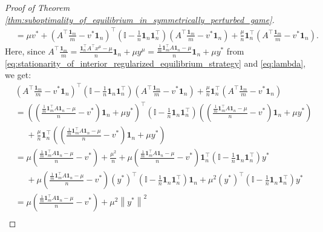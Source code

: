 \documentclass{article}
\newcommand{\bone}{\mathbf{1}}
\theoremstyle{plain}
\begin{document}
\begin{proof}[Proof of Theorem \ref{thm:suboptimality_of_equilibrium_in_symmetrically_perturbed_game}]
\begin{align}
        & = \mu v^{\ast} + \left(A^{\top}\frac{\bone_m}{m} - v^{\ast}\bone_n\right)^{\top}\left(\mathbb{I} - \frac{1}{n}\bone_n\bone_n^{\top}\right)\left(A^{\top}\frac{\bone_m}{m} - v^{\ast}\bone_n\right) + \frac{\mu}{n}\bone_n^{\top}\left(A^{\top}\frac{\bone_m}{m} - v^{\ast}\bone_n\right).
        \label{eq:tmp1}
    \end{align}
    Here, since $A^{\top}\frac{\bone_m}{m} = \frac{\bone_n^{\top}A^{\top}x^{\mu} - \mu}{n} \bone_n + \mu y^{\mu} = \frac{\frac{1}{m}\bone_m^{\top}A\bone_n - \mu}{n} \bone_n + \mu y^{\ast}$ from \eqref{eq:stationarity_of_interior_regularized_equilibrium_strategy} and \eqref{eq:lambda}, we get:
    \begin{align}
        & \left(A^{\top}\frac{\bone_m}{m} - v^{\ast}\bone_n\right)^{\top}\left(\mathbb{I} - \frac{1}{n}\bone_n\bone_n^{\top}\right)\left(A^{\top}\frac{\bone_m}{m} - v^{\ast}\bone_n\right) + \frac{\mu}{n}\bone_n^{\top}\left(A^{\top}\frac{\bone_m}{m} - v^{\ast}\bone_n\right) \nonumber                       \\
        & = \left(\left(\frac{\frac{1}{m}\bone_m^{\top}A\bone_n - \mu}{n} - v^{\ast}\right) \bone_n + \mu y^{\ast}\right)^{\top}\left(\mathbb{I} - \frac{1}{n}\bone_n\bone_n^{\top}\right)\left(\left(\frac{\frac{1}{m}\bone_m^{\top}A\bone_n - \mu}{n} - v^{\ast}\right) \bone_n + \mu y^{\ast}\right) \nonumber \\
        & \phantom{=} + \frac{\mu}{n}\bone_n^{\top}\left(\left(\frac{\frac{1}{m}\bone_m^{\top}A\bone_n - \mu}{n} - v^{\ast}\right) \bone_n + \mu y^{\ast}\right) \nonumber                                                                                                                                        \\
        & = \mu\left(\frac{\frac{1}{m}\bone_m^{\top}A\bone_n - \mu}{n} - v^{\ast}\right) + \frac{\mu^2}{n} + \mu\left(\frac{\frac{1}{m}\bone_m^{\top}A\bone_n - \mu}{n} - v^{\ast}\right)\bone_n^{\top}\left(\mathbb{I} - \frac{1}{n}\bone_n\bone_n^{\top}\right)y^{\ast} \nonumber                               \\
        & \phantom{=} + \mu\left(\frac{\frac{1}{m}\bone_m^{\top}A\bone_n - \mu}{n} - v^{\ast}\right)(y^{\ast})^{\top}\left(\mathbb{I} - \frac{1}{n}\bone_n\bone_n^{\top}\right)\bone_n + \mu^2 (y^{\ast})^{\top}\left(\mathbb{I} - \frac{1}{n}\bone_n\bone_n^{\top}\right)y^{\ast} \nonumber                      \\
        & = \mu\left(\frac{\frac{1}{m}\bone_m^{\top}A\bone_n - \mu}{n} - v^{\ast}\right) + \mu^2 \left\|y^{\ast}\right\|^2 \nonumber                                                                                                                                                                              \\

\end{align}
\end{proof}
\end{document}
